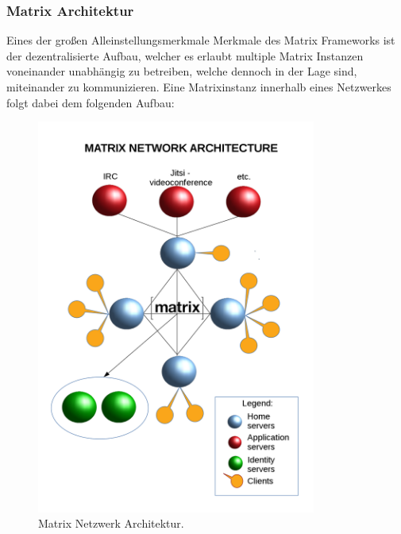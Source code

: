 \subsubsection{Matrix Architektur}\label{chapter:aemn}
Eines der großen Alleinstellungsmerkmale Merkmale des Matrix Frameworks ist der dezentralisierte Aufbau, welcher es erlaubt multiple Matrix Instanzen voneinander unabhängig zu betreiben, welche dennoch in der Lage sind, miteinander zu kommunizieren. Eine Matrixinstanz innerhalb eines Netzwerkes folgt dabei dem folgenden Aufbau:

\begin{figure}[htb]
    \centering
    \includegraphics[height=13cm]{graphics/1280px-Diagramme_Matrix_en.png}
    \caption[Matrix Netzwerk Architektur]{Matrix Netzwerk Architektur.}
    \label{abb:DHBWLogo}
\end{figure}

